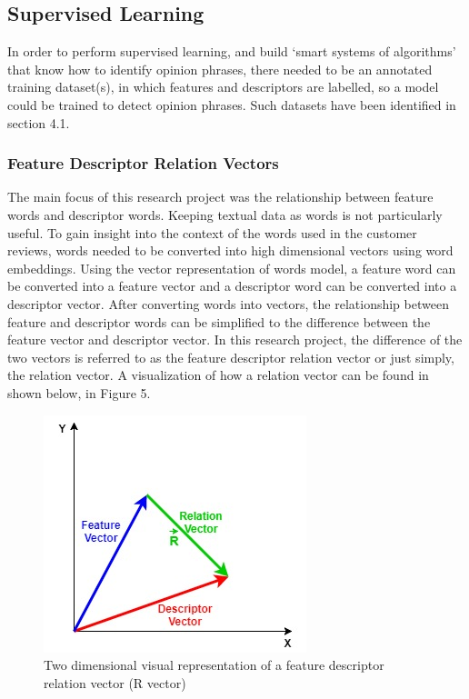 \documentclass{sig-alternate}
\begin{document}
\subsection{Supervised Learning}
In order to perform supervised learning, and build `smart systems of algorithms' that know how to identify opinion phrases, there needed to be an annotated training dataset(s), in which features and descriptors are labelled, so a model could be trained to detect opinion phrases. Such datasets have been identified in section 4.1. 

\subsubsection{Feature Descriptor Relation Vectors}
The main focus of this research project was the relationship between feature words and descriptor words. Keeping textual data as words is not particularly useful. To gain insight into the context of the words used in the customer reviews, words needed to be converted into high dimensional vectors using word embeddings. Using the vector representation of words model, a feature word can be converted into a feature vector and a descriptor word can be converted into a descriptor vector. After converting words into vectors, the relationship between feature and descriptor words can be simplified to the difference between the feature vector and descriptor vector. In this research project, the difference of the two vectors is referred to as the feature descriptor relation vector or just simply, the relation vector. A visualization of how a relation vector can be found in shown below, in Figure 5.

\begin{figure}
\centering
\includegraphics[scale=0.60]{images/relation_vec.jpg}
\caption{Two dimensional visual representation of a feature descriptor relation vector (R vector)}
\end{figure}
\end{document}
